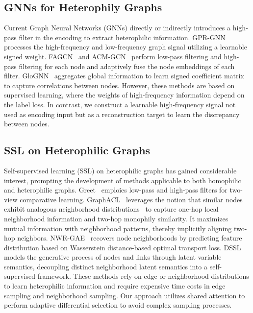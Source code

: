 \documentclass[sigconf]{acmart}
\begin{document}
\subsection{GNNs for Heterophily Graphs}
Current Graph Neural Networks (GNNs) directly or indirectly introduces a high-pass filter in the encoding to extract heterophilic information. GPR-GNN~\cite{GPRGNN} processes the high-frequency and low-frequency graph signal utilizing a learnable signed weight. FAGCN~\cite{fagcn} and ACM-GCN~\cite{acmgnn} perform low-pass filtering and high-pass filtering for each node and adaptively fuse the node embeddings of each filter. GloGNN~\cite{glognn} aggregates global information to learn signed coefficient matrix to capture correlations between nodes. However, these methods are based on supervised learning, where the weights of high-frequency information depend on the label loss. In contrast, we construct a learnable high-frequency signal not used as encoding input but as a reconstruction target to learn the discrepancy between nodes.

\subsection{SSL on Heterophilic Graphs}
Self-supervised learning (SSL) on heterophilic graphs has gained considerable interest, prompting the development of methods applicable to both homophilic and heterophilic graphs. Greet~\cite{greet} emploies low-pass and high-pass filters for two-view comparative learning. GraphACL~\cite{graphacl} leverages the notion that similar nodes exhibit analogous neighborhood distributions~\cite{homophily} to capture one-hop local neighborhood information and two-hop monophily similarity. It maximizes mutual information with neighborhood patterns, thereby implicitly aligning two-hop neighbors. NWR-GAE~\cite{NWR-GAE} recovers node neighborhoods by predicting feature distribution based on Wasserstein distance-based optimal transport loss. DSSL~\cite{dssl} models the generative process of nodes and links through latent variable semantics, decoupling distinct neighborhood latent semantics into a self-supervised framework. These methods rely on edge or neighborhood distributions to learn heterophilic information and require expensive time costs in edge sampling and neighborhood sampling. Our approach utilizes shared attention to perform adaptive differential selection to avoid complex sampling processes.
\end{document}
